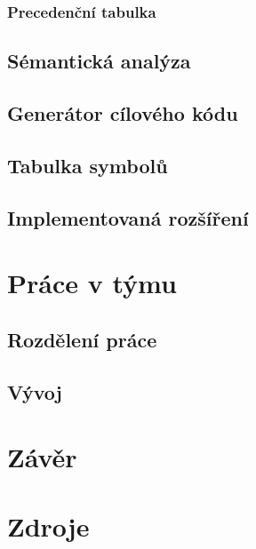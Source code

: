 \documentclass[11pt,a4paper]{article}
\begin{document}
        \subsubsection{Precedenční tabulka}
    \subsection{Sémantická analýza}
    \subsection{Generátor cílového kódu}
    \subsection{Tabulka symbolů}
    \subsection{Implementovaná rozšíření}
\section{Práce v týmu}
\subsection{Rozdělení práce}
\subsection{Vývoj}
\section{Závěr}

\newpage

\section{Zdroje}
    
    
\end{document}
